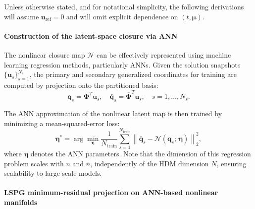 Unless otherwise stated, and for notational simplicity, the following derivations will assume $\mathbf{u}_{\text{ref}}=0$ and will omit explicit dependence on $(t,\boldsymbol{\mu})$.



\paragraph{Construction of the latent-space closure via ANN}
The nonlinear closure map $\mathcal{N}$ can be effectively represented using machine learning regression methods, particularly ANNs. Given the solution snapshots $\{\mathbf{u}_{s}\}_{s=1}^{N_s}$, the primary and secondary generalized coordinates for training are computed by projection onto the partitioned basis:
\begin{equation}
\mathbf{q}_{s} = \boldsymbol{\Phi}^T \mathbf{u}_{s},\quad
\bar{\mathbf{q}}_{s} = \overline{\boldsymbol{\Phi}}^T \mathbf{u}_{s}, 
\quad s = 1,\dots,N_s.
\label{eq:proj_coordinates_ann}
\end{equation}


The ANN approximation of the nonlinear latent map is then trained by minimizing a mean-squared-error loss:
\begin{equation}
\boldsymbol{\eta}^{*} = \arg\min_{\boldsymbol{\eta}} 
\frac{1}{N_{\text{train}}}
\sum_{s=1}^{N_{\text{train}}}
\left\|
\bar{\mathbf{q}}_{s}
-
\mathcal{N}(\mathbf{q}_{s};\,\boldsymbol{\eta})
\right\|_{2}^{2},
\label{eq:ann_training}
\end{equation}
where $\boldsymbol{\eta}$ denotes the ANN parameters. Note that the dimension of this regression problem scales with $n$ and $\bar{n}$, independently of the HDM dimension $N$, ensuring scalability to large-scale models.


\paragraph{LSPG minimum-residual projection on ANN-based nonlinear manifolds}

